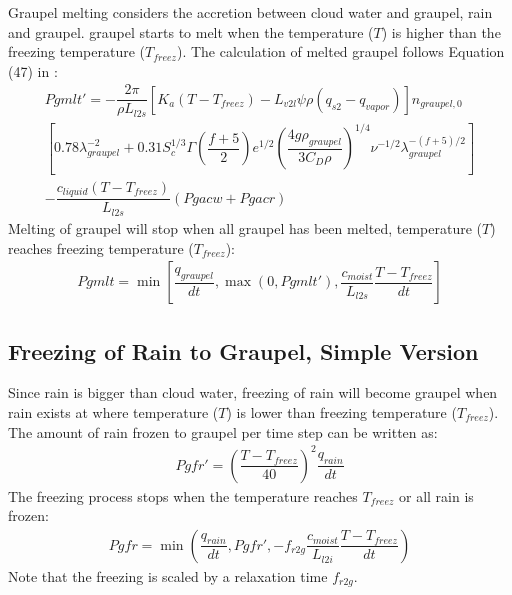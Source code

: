 \documentclass[letterpaper,titlepage,10pt]{article}
\numberwithin{equation}{section}
\begin{document}
Graupel melting considers the accretion between cloud water and graupel, rain and graupel. graupel starts to melt when the temperature ($T$) is higher than the freezing temperature ($T_{freez}$). The calculation of melted graupel follows Equation (47) in \citet{lin1983bulk}:
\begin{multline}
	Pgmlt' = - \dfrac{2 \pi}{\rho L_{l2s}} \left[K_a \left(T - T_{freez} \right) - L_{v2l} \psi \rho \left(q_{s2} - q_{vapor} \right) \right] n_{graupel,0} \\
	\left[0.78 \lambda^{-2}_{graupel} + 0.31 S^{1/3}_c \Gamma \left(\dfrac{f + 5}{2} \right) e^{1/2} \left(\dfrac{4 g \rho_{graupel}}{3 C_D \rho} \right)^{1/4} \nu^{-1/2} \lambda^{-\left(f + 5 \right)/2}_{graupel} \right] \\
	- \dfrac{c_{liquid} \left(T - T_{freez} \right)}{L_{l2s}} \left(Pgacw + Pgacr \right)
\end{multline}
Melting of graupel will stop when all graupel has been melted, temperature ($T$) reaches freezing temperature ($T_{freez}$):
\begin{gather}
	Pgmlt = \min \left[\dfrac{q_{graupel}}{dt}, \max \left(0, Pgmlt' \right), \dfrac{c_{moist}}{L_{l2s}} \dfrac{T - T_{freez}}{dt} \right]
\end{gather}


\subsection{Freezing of Rain to Graupel, Simple Version}

Since rain is bigger than cloud water, freezing of rain will become graupel when rain exists at where temperature ($T$) is lower than freezing temperature ($T_{freez}$). The amount of rain frozen to graupel per time step can be written as:
\begin{gather}
	Pgfr' = \left(\dfrac{T - T_{freez}}{40} \right)^2 \dfrac{q_{rain}}{dt}
\end{gather}
The freezing process stops when the temperature reaches $T_{freez}$ or all rain is frozen:
\begin{gather}
	Pgfr = \min \left(\dfrac{q_{rain}}{dt}, Pgfr', - f_{r2g} \dfrac{c_{moist}}{L_{l2i}} \dfrac{T - T_{freez}}{dt} \right)
\end{gather}
Note that the freezing is scaled by a relaxation time $f_{r2g}$.

\end{document}
